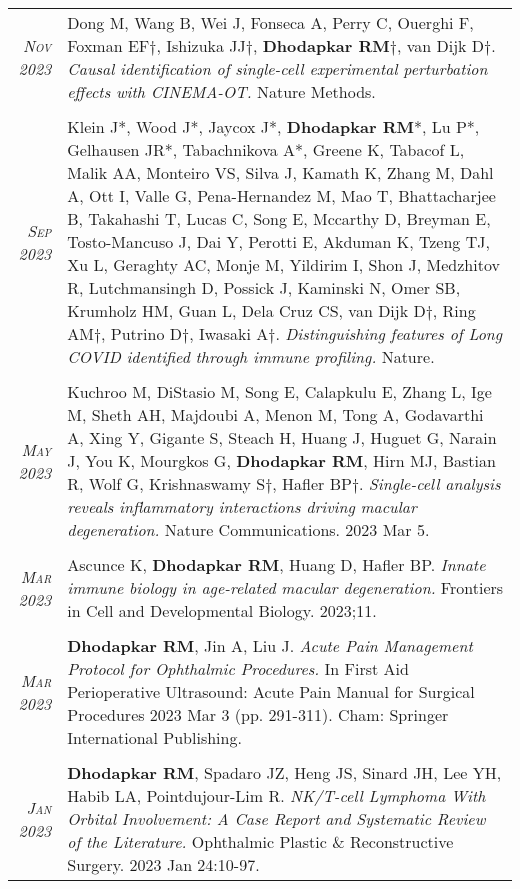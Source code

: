 \documentclass[a4paper,10pt]{article}
\begin{document}
\begin{longtable}{rp{11cm}}
\textit{\textsc{Nov} 2023}& Dong M, Wang B, Wei J, Fonseca A, Perry C, Ouerghi F, Foxman EF$\dag$, Ishizuka JJ$\dag$, {\bf Dhodapkar RM}$\dag$, van Dijk D$\dag$. {\it Causal identification of single-cell experimental perturbation effects with CINEMA-OT.} Nature Methods. \\
\multicolumn{2}{c}{} \\
\textit{\textsc{Sep} 2023}& Klein J*, Wood J*, Jaycox J*, {\bf Dhodapkar RM}*, Lu P*, Gelhausen JR*, Tabachnikova A*, Greene K, Tabacof L, Malik AA, Monteiro VS, Silva J, Kamath K, Zhang M, Dahl A, Ott I, Valle G, Pena-Hernandez M, Mao T, Bhattacharjee B, Takahashi T, Lucas C, Song E, Mccarthy D, Breyman E, Tosto-Mancuso J, Dai Y, Perotti E, Akduman K, Tzeng TJ, Xu L, Geraghty AC, Monje M, Yildirim I, Shon J, Medzhitov R, Lutchmansingh D, Possick J, Kaminski N, Omer SB, Krumholz HM, Guan L, Dela Cruz CS, van Dijk D$\dag$, Ring AM$\dag$, Putrino D$\dag$, Iwasaki A$\dag$. {\it Distinguishing features of Long COVID identified through immune profiling.} Nature. \\
\multicolumn{2}{c}{} \\
 \textit{\textsc{May} 2023}& Kuchroo M, DiStasio M, Song E, Calapkulu E, Zhang L, Ige M, Sheth AH, Majdoubi A, Menon M, Tong A, Godavarthi A, Xing Y, Gigante S, Steach H, Huang J, Huguet G, Narain J, You K, Mourgkos G, {\bf Dhodapkar RM}, Hirn MJ, Bastian R, Wolf G, Krishnaswamy S$\dag$, Hafler BP$\dag$. {\it Single-cell analysis reveals inflammatory interactions driving macular degeneration.} Nature Communications. 2023 Mar 5. \\
\multicolumn{2}{c}{} \\
 \textit{\textsc{Mar} 2023}& Ascunce K, {\bf Dhodapkar RM}, Huang D, Hafler BP. {\it Innate immune biology in age-related macular degeneration.} Frontiers in Cell and Developmental Biology. 2023;11.
 \\
\multicolumn{2}{c}{} \\
 \textit{\textsc{Mar} 2023}& {\bf Dhodapkar RM}, Jin A, Liu J. {\it Acute Pain Management Protocol for Ophthalmic Procedures.} In First Aid Perioperative Ultrasound: Acute Pain Manual for Surgical Procedures 2023 Mar 3 (pp. 291-311). Cham: Springer International Publishing.
 \\
\multicolumn{2}{c}{} \\
\textit{\textsc{Jan} 2023}& {\bf Dhodapkar RM}, Spadaro JZ, Heng JS, Sinard JH, Lee YH, Habib LA, Pointdujour-Lim R. {\it NK/T-cell Lymphoma With Orbital Involvement: A Case Report and Systematic Review of the Literature.} Ophthalmic Plastic \& Reconstructive Surgery. 2023 Jan 24:10-97.

\end{longtable}
\end{document}
